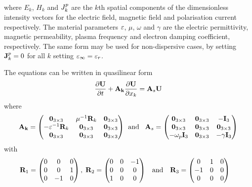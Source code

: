 where $E_k$, $H_k$ and $J^p_k$ are the $k$th spatial components of the
dimensionless intensity vectors for the electric field, magnetic field and 
polarisation current respectively. The material parameters $\varepsilon$, $\mu$,
$\omega$ and $\gamma$ are the electric permittivity, magnetic permeability,
plasma frequency and electron damping coefficient, respectively. The same form
may be used for non-dispersive cases, by setting $\mathbf{J}^p_k = 0$ for all $k$
setting $\varepsilon_{\infty} = \varepsilon_{r}$.

The equations can be written in quasilinear form
\begin{equation}
  \label{eq:quasilinear-form}
  \frac{\partial \mathbf{U}}{\partial t}  + \mathbf{A}_\mathbf{k}\frac{\partial \mathbf{U}}{\partial x_k}= \mathbf{A}_s \mathbf{U}
\end{equation}
where
\begin{align}
  \mathbf{A}_\mathbf{k} = 
  \begin{pmatrix}
    \mathbf{0}_{3\times3} & \mu^{-1} \mathbf{R}_{k} & \mathbf{0}_{3\times3} \\
    -\varepsilon^{-1} \mathbf{R}_{k} & \mathbf{0}_{3\times3} & \mathbf{0}_{3\times3} \\
    \mathbf{0}_{3\times3} & \mathbf{0}_{3\times3} & \mathbf{0}_{3\times3} \\
  \end{pmatrix}
  \: \:
  \textrm{and}\;\;\;
  \mathbf{A}_s = 
  \begin{pmatrix}
    \mathbf{0}_{3\times3}  & \mathbf{0}_{3\times3} & -\mathbf{I}_3\\
    \mathbf{0}_{3\times3} & \mathbf{0}_{3\times3} & \mathbf{0}_{3\times3} \\
    -\omega_p \mathbf{I}_3 & \mathbf{0}_{3\times3} & - \gamma \mathbf{I}_3 \\
  \end{pmatrix}
\end{align}
with
\begin{align}
  \mathbf{R}_1 = 
  \begin{pmatrix}
    0 & 0 & 0 \\
    0 & 0 & 1 \\
    0 & -1 & 0 \\
  \end{pmatrix} , \: \: & \mathbf{R}_2 =
                          \begin{pmatrix}
                            0 & 0 & -1 \\
                            0 & 0 & 0 \\
                            1 & 0 & 0 \\
                          \end{pmatrix}
      &
        \textrm{and   } \:\:\:
          &
            \mathbf{R}_3 = 
            \begin{pmatrix}
              0 & 1 & 0 \\
              -1 & 0 & 0 \\
              0 & 0 & 0 \\
            \end{pmatrix}
      &
\end{align}

